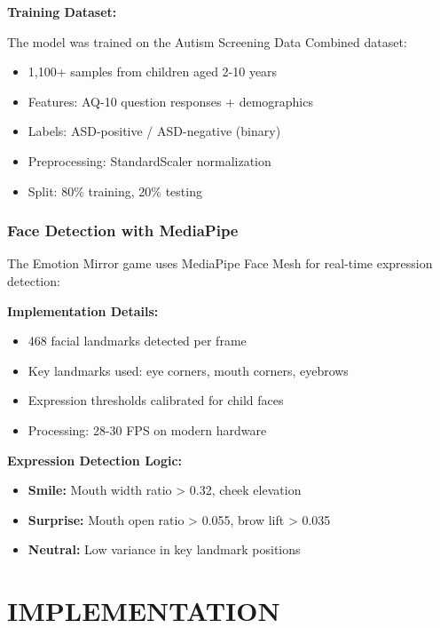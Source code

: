 \documentclass[12pt,letterpaper]{article}
\begin{document}
\textbf{Training Dataset:}

The model was trained on the Autism Screening Data Combined dataset:
\begin{itemize}
    \item 1,100+ samples from children aged 2-10 years
    \item Features: AQ-10 question responses + demographics
    \item Labels: ASD-positive / ASD-negative (binary)
    \item Preprocessing: StandardScaler normalization
    \item Split: 80\% training, 20\% testing
\end{itemize}

\subsubsection{Face Detection with MediaPipe}

The Emotion Mirror game uses MediaPipe Face Mesh for real-time expression detection:

\textbf{Implementation Details:}
\begin{itemize}
    \item 468 facial landmarks detected per frame
    \item Key landmarks used: eye corners, mouth corners, eyebrows
    \item Expression thresholds calibrated for child faces
    \item Processing: 28-30 FPS on modern hardware
\end{itemize}

\textbf{Expression Detection Logic:}
\begin{itemize}
    \item \textbf{Smile:} Mouth width ratio > 0.32, cheek elevation
    \item \textbf{Surprise:} Mouth open ratio > 0.055, brow lift > 0.035
    \item \textbf{Neutral:} Low variance in key landmark positions
\end{itemize}

\newpage



\section{IMPLEMENTATION}
\end{document}
